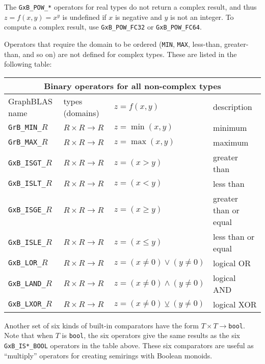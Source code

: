 \documentclass[12pt]{article}
\begin{document}
The \verb'GxB_POW_*' operators for real types do not return a complex result,
and thus $z = f(x,y) = x^y$ is undefined if $x$ is negative and $y$ is not an
integer.  To compute a complex result, use \verb'GxB_POW_FC32' or
\verb'GxB_POW_FC64'.

Operators that require the domain to be ordered (\verb'MIN', \verb'MAX',
less-than, greater-than, and so on) are not defined for
complex types.  These are listed in the following table:

\vspace{0.2in}
{\footnotesize
\begin{tabular}{|llll|}
\hline
\multicolumn{4}{|c|}{Binary operators for all non-complex types} \\
\hline
GraphBLAS name        & types (domains)            & $z=f(x,y)$      & description \\
\hline
\verb'GrB_MIN_'$R$    & $R \times R \rightarrow R$ & $z = \min(x,y)$ & minimum \\
\verb'GrB_MAX_'$R$    & $R \times R \rightarrow R$ & $z = \max(x,y)$ & maximum \\
\hline
\verb'GxB_ISGT_'$R$   & $R \times R \rightarrow R$ & $z = (x >   y)$ & greater than \\
\verb'GxB_ISLT_'$R$   & $R \times R \rightarrow R$ & $z = (x <   y)$ & less than  \\
\verb'GxB_ISGE_'$R$   & $R \times R \rightarrow R$ & $z = (x \ge y)$ & greater than or equal \\
\verb'GxB_ISLE_'$R$   & $R \times R \rightarrow R$ & $z = (x \le y)$ & less than or equal  \\
\hline
\verb'GxB_LOR_'$R$    & $R \times R \rightarrow R$ & $z = (x \ne 0) \vee    (y \ne 0) $ & logical OR \\
\verb'GxB_LAND_'$R$   & $R \times R \rightarrow R$ & $z = (x \ne 0) \wedge  (y \ne 0) $ & logical AND \\
\verb'GxB_LXOR_'$R$   & $R \times R \rightarrow R$ & $z = (x \ne 0) \veebar (y \ne 0) $ & logical XOR \\
\hline
\end{tabular}
}
\vspace{0.2in}

Another set of six kinds of built-in comparators have the form $T
\times T \rightarrow $\verb'bool'.  Note that when $T$ is \verb'bool', the six
operators give the same results as the six \verb'GxB_IS*_BOOL' operators in the
table above.  These six comparators are useful as ``multiply''
operators for creating semirings with Boolean monoids.
\end{document}
